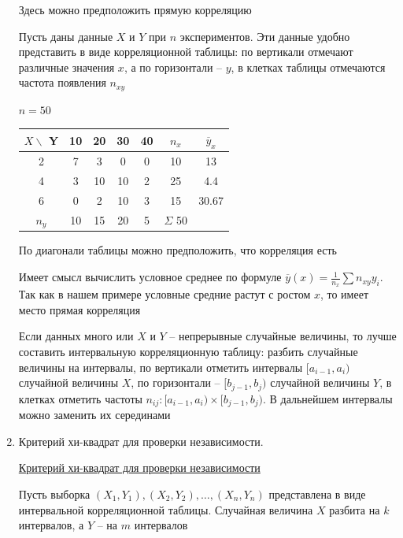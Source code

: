 \begin{enumerate}
\begin{multicols}{2}
\begin{center}
            Здесь можно предположить прямую корреляцию
        \end{center}
    \end{multicols}

    Пусть даны данные $X$ и $Y$ при $n$ экспериментов. Эти данные удобно представить в виде корреляционной таблицы:
    по вертикали отмечают различные значения $x$, а по горизонтали -- $y$, в клетках таблицы отмечаются частота появления $n_{xy}$

    \Ex $n = 50$

    \smallvspace

    \begin{tabular}{c|c|c|c|c|c|c}
        $X\backslash$ Y & 10 & 20 & 30 & 40 & $n_x$ & $\overline y_x$ \\
        \hline
        2 & 7 & 3 & 0 & 0 & 10 & 13 \\
        \hline
        4 & 3 & 10 & 10 & 2 & 25 & 4.4 \\
        \hline
        6 & 0 & 2 & 10 & 3 & 15 & 30.67 \\
        \hline
        $n_y$ & 10 & 15 & 20 & 5 & $\Sigma$ 50 & \\
    \end{tabular}

    \smallvspace

    По диагонали таблицы можно предположить, что корреляция есть

    Имеет смысл вычислить условное среднее по формуле $\overline y (x) = \frac{1}{n_x} \sum n_{xy} y_i$. Так как в нашем примере
    условные средние растут с ростом $x$, то имеет место прямая корреляция

    \Notas Если данных много или $X$ и $Y$ -- непрерывные случайные величины, то лучше составить интервальную корреляционную таблицу:
    разбить случайные величины на интервалы, по вертикали отметить интервалы $[a_{i - 1}, a_i)$ случайной величины $X$, 
    по горизонтали -- $[b_{j - 1}, b_j)$ случайной величины $Y$, в клетках 
    отметить частоты $n_{ij} : [a_{i - 1}, a_i) \times [b_{j - 1}, b_j)$. В дальнейшем интервалы можно заменить их серединами

    \item Критерий хи-квадрат для проверки независимости.

    \hyperlink{chi_square_independence_criterion}{Критерий хи-квадрат для проверки независимости}
    
    Пусть выборка $(X_1, Y_1), (X_2, Y_2), \dots, (X_n, Y_n)$ представлена в виде интервальной корреляционной таблицы. Случайная величина $X$ 
    разбита на $k$ интервалов, а $Y$ -- на $m$ интервалов


\end{enumerate}

